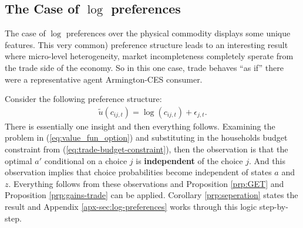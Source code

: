 \documentclass[12pt,pdftex]{article}
\begin{document}
\begin{onehalfspacing}
\subsection{The Case of $\log$ preferences}\label{sec:log-preferences}

The case of $\log$ preferences over the physical commodity displays some unique features. This very common) preference structure leads to an interesting result where micro-level heterogeneity, market incompleteness completely sperate from the trade side of the economy. So in this one case, trade behaves ``as if'' there were a representative agent Armington-CES consumer.

Consider the following preference structure:
\begin{align}
\tilde{u}( c_{ij,t} ) =  \log(c_{ij,t}) + \epsilon_{j,t}. \nonumber
\end{align}
There is essentially one insight and then everything follows. Examining the problem in (\ref{eq:value_fun_option}) and substituting in the households budget constraint from (\ref{eq:trade-budget-constraint}), then the observation is that the optimal $a'$ conditional on a choice $j$ is \textbf{independent} of the choice $j$. And this observation implies that choice probabilities become independent of states $a$ and $z$. Everything follows from these observations and Proposition \ref{prp:GET} and Proposition \ref{prp:gains-trade} can be applied. Corollary \ref{prp:seperation} states the result and Appendix \ref{apx-sec:log-preferences} works through this logic step-by-step.


\end{onehalfspacing}
\end{document}
